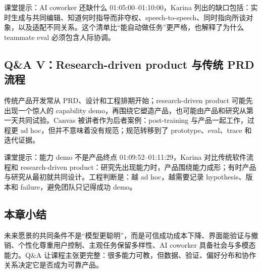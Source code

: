 \begin{knowledgebox}{课堂提示：AI coworker 还缺什么}
01:05:00--01:10:00，Karina 列出的缺口包括：实时生成与共同编辑、知道何时指导而非夺权、speech-to-speech、同时指向所谈对象，以及适配不同关系。这个清单比“能自动做任务”更严格，也解释了为什么 teammate eval 必须包含人际协调。
\end{knowledgebox}

\subsection{Q\&A V：Research-driven product 与传统 PRD 流程}

传统产品开发常从 PRD、设计和工程排期开始；research-driven product 可能先出现一个惊人的 capability demo，再围绕它塑造产品，也可能由产品和研究从第一天共同试验。Canvas 被讲者作为后者案例：post-training 与产品一起工作，过程更 ad hoc，但并不意味着没有规范；规范转移到了 prototype、eval、trace 和迭代证据。

\begin{importantbox}{课堂提示：能力 demo 不是产品终点}
01:09:52--01:11:29，Karina 对比传统软件流程和 research-driven product：研究先出现能力时，产品围绕能力成形；有时产品与研究从最初就共同设计。工程判断是：越 ad hoc，越需要记录 hypothesis、版本和 failure，避免团队只记得成功 demo。
\end{importantbox}

\subsection{本章小结}

未来愿景的共同条件不是“模型更聪明”，而是可信成功成本下降、界面能验证与撤销、个性化尊重用户控制、主观任务保留多样性、AI coworker 具备社会与多模态能力。Q\&A 让课程主张更完整：很多能力可教，但数据、验证、偏好分布和协作关系决定它是否成为可靠产品。

